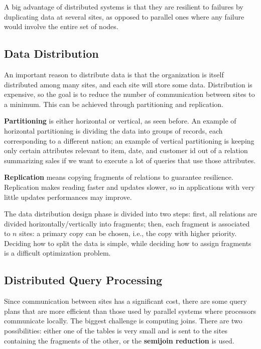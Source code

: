 A big advantage of distributed systems is that they are resilient to failures by duplicating data at several sites, as opposed to parallel ones where any failure would involve the entire set of nodes.

\subsection{Data Distribution}

An important reason to distribute data is that the organization is itself distributed among many sites, and each site will store some data. Distribution is expensive, so the goal is to reduce the number of communication between sites to a minimum. This can be achieved through partitioning and replication.

\textbf{Partitioning} is either horizontal or vertical, as seen before. An example of horizontal partitioning is dividing the data into groups of records, each corresponding to a different nation; an example of vertical partitioning is keeping only certain attributes relevant to item, date, and customer id out of a relation summarizing sales if we want to execute a lot of queries that use those attributes.

\textbf{Replication} means copying fragments of relations to guarantee resilience. Replication makes reading faster and updates slower, so in applications with very little updates performances may improve.

The data distribution design phase is divided into two steps: first, all relations are divided horizontally/vertically into fragments; then, each fragment is associated to $n$ sites: a primary copy can be chosen, i.e., the copy with higher priority. Deciding how to split the data is simple, while deciding how to assign fragments is a difficult optimization problem.

\subsection{Distributed Query Processing}

Since communication between sites has a significant cost, there are some query plans that are more efficient than those used by parallel systems where processors communicate locally. The biggest challenge is computing joins. There are two possibilities: either one of the tables is very small and is sent to the sites containing the fragments of the other, or the \textbf{semijoin reduction} is used.

